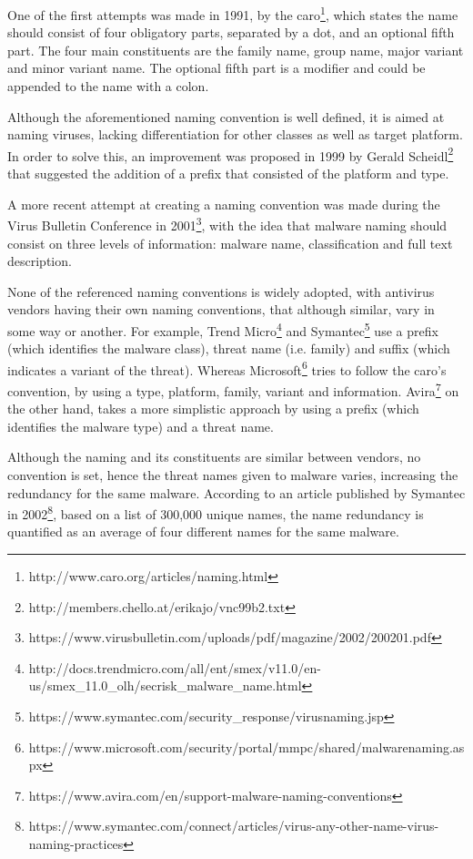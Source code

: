 \documentclass{llncs}
\begin{document}
One of the first attempts was made in 1991, by the \gls{caro}\footnote{http://www.caro.org/articles/naming.html}, which states the name should consist of four  obligatory parts, separated by a dot, and an optional fifth part. The four main constituents are the family name, group name, major variant and minor variant name. The optional fifth part is a modifier and could be appended to the name with a colon.

Although the aforementioned naming convention is well defined, it is aimed at naming viruses, lacking differentiation for other classes as well as target platform. In order to solve this, an improvement was proposed in 1999 by Gerald Scheidl\footnote{http://members.chello.at/erikajo/vnc99b2.txt} that suggested the addition of a prefix that consisted of the platform and type.

A more recent attempt at creating a naming convention was made during the Virus Bulletin Conference in 2001\footnote{https://www.virusbulletin.com/uploads/pdf/magazine/2002/200201.pdf}, with the idea that malware naming should consist on three levels of information: malware name, classification and full text description.

None of the referenced naming conventions is widely adopted, with antivirus vendors having their own naming conventions, that although similar, vary in some way or another. For example, Trend Micro\footnote{http://docs.trendmicro.com/all/ent/smex/v11.0/en-us/smex\_11.0\_olh/secrisk\_malware\_name.html} and Symantec\footnote{https://www.symantec.com/security\_response/virusnaming.jsp} use a prefix (which identifies the malware class), threat name (i.e. family) and suffix (which indicates a variant of the threat). Whereas Microsoft\footnote{https://www.microsoft.com/security/portal/mmpc/shared/malwarenaming.aspx} tries to follow the \gls{caro}'s convention, by using a type, platform, family, variant and information. Avira\footnote{https://www.avira.com/en/support-malware-naming-conventions} on the other hand, takes a more simplistic approach by using a prefix (which identifies the malware type) and a threat name.

Although the naming and its constituents are similar between vendors, no convention is set, hence the threat names given to malware varies, increasing the redundancy for the same malware. According to an article published by Symantec in 2002\footnote{https://www.symantec.com/connect/articles/virus-any-other-name-virus-naming-practices}, based on a list of 300,000 unique names, the name redundancy is quantified as an average of four different names for the same malware.
\end{document}
